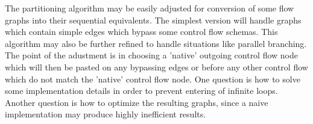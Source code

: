 \begin{rem} 
  The partitioning algorithm may be easily adjusted for conversion of some flow graphs into their sequential equivalents. The simplest version will handle graphs which contain simple edges which bypass some control flow schemas. This algorithm may also be further refined to handle situations like parallel branching. The point of the adustment is in choosing a 'native' outgoing control flow node which will then be pasted on any bypassing edges or before any other control flow which do not match the 'native' control flow node. One question is how to solve some implementation details in order to prevent entering of infinite loops. Another question is how to optimize the resulting graphs, since a naive implementation may produce highly inefficient results.  
\end{rem}


